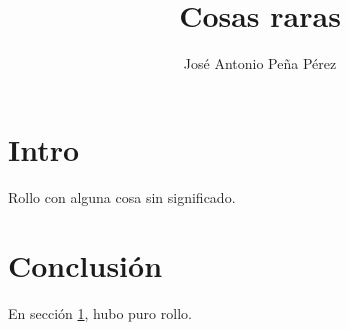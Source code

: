 \documentclass{article}
\title{Cosas raras}
\author{José Antonio Peña Pérez}
\begin{document}
\maketitle

\section{Intro}\label{intro}

Rollo con alguna cosa sin significado.

\section{Conclusión}

En sección \ref{intro}, hubo puro rollo.
\end{document}
